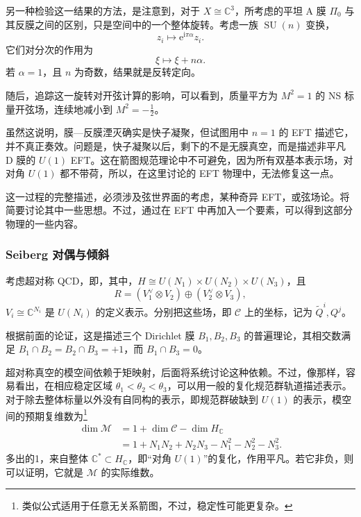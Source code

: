 另一种检验这一结果的方法，是注意到，对于 $X\cong\mathbb{C}^3$，所考虑的平坦 A 膜 $\Pi_0$ 与其反膜之间的区别，只是空间中的一个整体旋转。考虑一族 $\operatorname{SU}(n)$ 变换，
\[
z_i\longmapsto\mathrm{e}^{\mathrm{i}\pi\alpha}z_i.
\]
它们对分次的作用为
\[
\xi\longmapsto\xi+n\alpha.
\]
若 $\alpha=1$，且 $n$ 为奇数，结果就是反转定向。

随后，追踪这一旋转对开弦计算的影响，可以看到，质量平方为 $M^2=1$ 的 NS 标量开弦场，连续地减小到 $M^2=-\tfrac12$。

虽然这说明，膜—反膜湮灭确实是快子凝聚，但试图用中 $n=1$ 的 EFT 描述它，并不真正奏效。问题是，快子凝聚以后，剩下的不是无膜真空，而是描述非平凡 D 膜的 $U(1)$ EFT。这在箭图规范理论中不可避免，因为所有双基本表示场，对对角 $U(1)$ 都不带荷，所以，在这里讨论的 EFT 物理中，无法修复这一点。

这一过程的完整描述，必须涉及弦世界面的考虑，某种奇异 EFT，或弦场论。将简要讨论其中一些思想。不过，通过在 EFT 中再加入一个要素，可以得到这部分物理的一些内容。

\subsubsection{Seiberg 对偶与倾斜}\label{sec:5.4.4.5}

考虑超对称 QCD，即，其中，$H\cong U(N_1)\times U(N_2)\times U(N_3)$，且
\begin{equation}\label{eq:5.99}
R=(V_1^\vee\otimes V_2)\oplus(V_2^\vee\otimes V_3),
\end{equation}
$V_i\cong\mathbb{C}^{N_i}$ 是 $U(N_i)$ 的定义表示。分别把这些场，即 $\mathcal{C}$ 上的坐标，记为 $\widetilde Q^i,Q^j$。

根据前面的论证，这是描述三个 Dirichlet 膜 $B_1,B_2,B_3$ 的普遍理论，其相交数满足 $B_1\cap B_2=B_2\cap B_3=+1$，而 $B_1\cap B_3=0$。

超对称真空的模空间依赖于矩映射，后面将系统讨论这种依赖。不过，像那样，容易看出，在相应稳定区域 $\theta_1<\theta_2<\theta_3$，可以用一般的复化规范群轨道描述表示。对于除去整体标量以外没有自同构的表示，即规范群破缺到 $U(1)$ 的表示，模空间的预期复维数为\footnote{类似公式适用于任意无关系箭图，不过，稳定性可能更复杂。}
\begin{equation}\label{eq:5.100}
\begin{aligned}
\dim\mathcal{M}&=1+\dim\mathcal{C}-\dim H_{\mathbb C}\\
&=1+N_1N_2+N_2N_3-N_1^2-N_2^2-N_3^2.
\end{aligned}
\end{equation}
多出的1，来自整体 $\mathbb{C}^*\subset H_{\mathbb C}$，即“对角 $U(1)$”的复化，作用平凡。若它非负，则可以证明，它就是 $\mathcal{M}$ 的实际维数。

